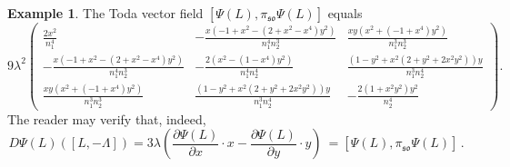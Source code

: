 \documentclass[reqno]{amsart}
\newcommand{\so}{\mathfrak{so}}
\theoremstyle{definition} %
\newtheorem{example}{Example}
\begin{document}
\begin{example}
The Toda vector field  $[\Psi(L),\pi_{\so}\Psi(L)]$  equals
	\[9 \lambda^2 \begin{pmatrix} \frac{2 x^2}{n_1^4} &-\frac{ x(-1+x^2-(2+x^2-x^4)y^2)}{n_1^4n_2^{3}}  & \frac{xy(x^2+(-1+x^4)y^2)}{n_1^{3}n_2^{3}} \\ 
		- \frac{ x(-1+x^2-(2+x^2-x^4)y^2)}{n_1^4n_2^{3}} & -\frac{2(x^2-(1-x^4)y^2)}{n_1^4n_2^4} &\frac{(1-y^2+x^2(2+y^2+2x^2y^2)) y}{n_1^3n_2^4} \\ 
		\frac{xy(x^2+(-1+x^4)y^2)}{n_1^{3}n_2^{3}} & \frac{(1-y^2+x^2(2+y^2+2x^2y^2)) y}{n_1^3n_2^4} & -\frac{2(1+x^2y^2)y^2}{n_2^4}\end{pmatrix} . \]
		The reader may verify that, indeed,
		\[ D \Psi(L) ([L, - \Lambda ])= 3 \lambda  \left( \frac{ \partial \Psi(L)}{\partial x} \cdot x  - \frac{\partial \Psi(L)}{\partial y} \cdot y \right) \  = [\Psi(L),\pi_{\so}\Psi(L)] \, .\]
\end{example}
%
\end{document}
